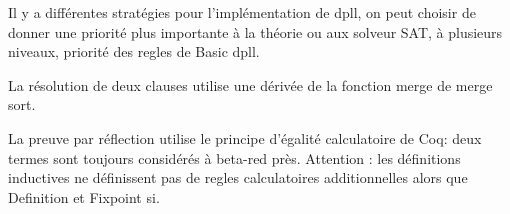 Il y a différentes stratégies pour l'implémentation de dpll, on peut choisir de donner une priorité
plus importante à la théorie ou aux solveur SAT, à plusieurs niveaux, priorité des regles de Basic dpll. 

La résolution de deux clauses utilise une dérivée de la fonction merge de merge sort.

La preuve par réflection utilise le principe d'égalité calculatoire de Coq: deux termes sont
toujours considérés à beta-red près. Attention : les définitions inductives ne définissent pas
de regles calculatoires additionnelles alors que Definition et Fixpoint si.








